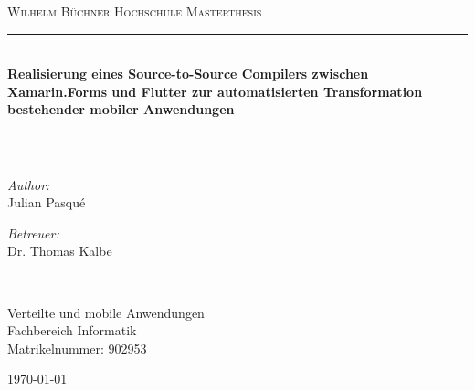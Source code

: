 \begin{titlepage}
\begin{center}
\newcommand{\HRule}{\rule{.9\linewidth}{.6pt}} %

\vspace*{.06\textheight}
{\scshape\LARGE Wilhelm Büchner Hochschule}\vspace{1.5cm} %
\textsc{\Large Masterthesis}\\[0.5cm] %

\HRule \\[0.4cm] %


\Large\textbf{ Realisierung eines Source-to-Source Compilers zwischen Xamarin.Forms und Flutter zur automatisierten Transformation bestehender mobiler 
Anwendungen}\par


\HRule \\[1.5cm] %
 
\begin{minipage}[t]{0.4\textwidth}
\begin{flushleft} \large
\emph{Author:}\\
Julian Pasqué %
\end{flushleft}
\end{minipage}
\begin{minipage}[t]{0.4\textwidth}
\begin{flushright} \large
\emph{Betreuer:} \\
Dr. Thomas Kalbe %
\end{flushright}
\end{minipage}\\[3cm]
 
\vfill


\large Verteilte und mobile Anwendungen\\[0.8cm] %
\large Fachbereich Informatik\\[0.8cm] %
\large Matrikelnummer: 902953 \\[0.8cm] %
 
\vfill

{\large \today}\\[6cm] %
 
\vfill
\end{center}
\end{titlepage}